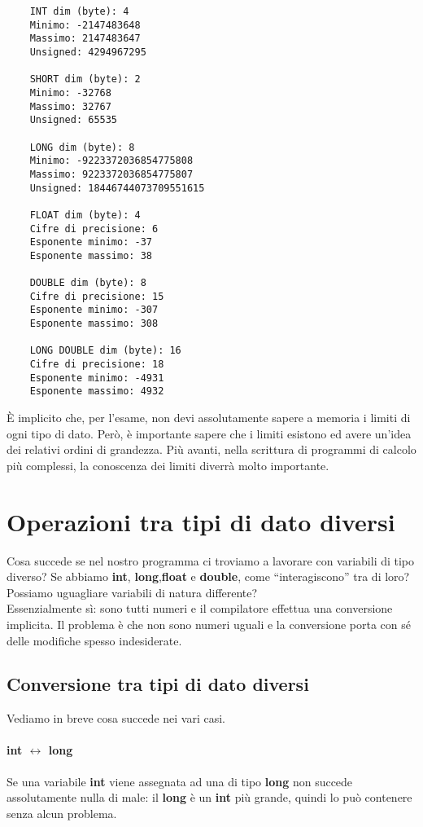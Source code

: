 	\begin{shaded}
	
			\begin{verbatim}
	INT dim (byte): 4
	Minimo: -2147483648
	Massimo: 2147483647
	Unsigned: 4294967295
	
	SHORT dim (byte): 2
	Minimo: -32768
	Massimo: 32767
	Unsigned: 65535
	
	LONG dim (byte): 8
	Minimo: -9223372036854775808
	Massimo: 9223372036854775807
	Unsigned: 18446744073709551615
	
	FLOAT dim (byte): 4
	Cifre di precisione: 6
	Esponente minimo: -37
	Esponente massimo: 38
	
	DOUBLE dim (byte): 8
	Cifre di precisione: 15
	Esponente minimo: -307
	Esponente massimo: 308
	
	LONG DOUBLE dim (byte): 16
	Cifre di precisione: 18
	Esponente minimo: -4931
	Esponente massimo: 4932	
\end{verbatim}%
\end{shaded}\label{caratt}
	\`E implicito che, per l'esame, non devi assolutamente sapere a memoria i limiti di ogni tipo di dato. Però, è importante sapere che i limiti esistono ed avere un'idea dei relativi ordini di grandezza. Più avanti, nella scrittura di programmi di calcolo più complessi, la conoscenza dei limiti diverrà molto importante.
	

	
	\section{Operazioni tra tipi di dato diversi}
	Cosa succede se nel nostro programma ci troviamo  a lavorare con variabili di tipo diverso? Se abbiamo \textbf{int}, \textbf{long},\textbf{float} e \textbf{double}, come ``interagiscono'' tra di loro? Possiamo uguagliare variabili di natura differente?
	\\Essenzialmente sì: sono tutti numeri e il compilatore effettua una conversione implicita. Il problema è che non sono numeri uguali e la conversione porta con sé delle modifiche spesso indesiderate. 
	
	\subsection{Conversione tra tipi di dato diversi}
	Vediamo in breve cosa succede nei vari casi.
	\paragraph{int $\leftrightarrow$ long} Se una variabile \textbf{int} viene assegnata ad una di tipo \textbf{long} non succede assolutamente nulla di male: il \textbf{long} è un \textbf{int} più grande, quindi lo può contenere senza alcun problema.
	
